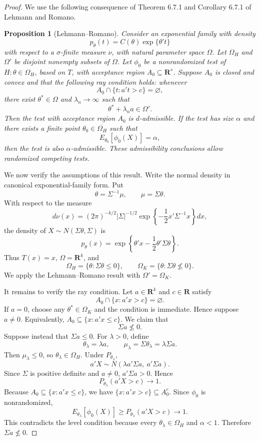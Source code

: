 \documentclass[11pt]{article}
\newtheorem{proposition}{Proposition}
\begin{document}
\begin{proof}
We use the following consequence of Theorem 6.7.1 and Corollary 6.7.1 of Lehmann and Romano.

\begin{proposition}[Lehmann--Romano]
Consider an exponential family with density
\[
p_\theta(t)=C(\theta)\exp\{\theta't\}
\]
with respect to a $\sigma$-finite measure $\nu$, with natural parameter space $\Omega$. Let $\Omega_H$ and $\Omega'$ be disjoint nonempty subsets of $\Omega$. Let $\phi_0$ be a nonrandomized test of $H:\theta\in\Omega_H$, based on $T$, with acceptance region $A_0\subseteq\mathbf R^s$. Suppose $A_0$ is closed and convex and that the following ray condition holds: whenever
\[
A_0\cap\{t:a't>c\}=\varnothing,
\]
there exist $\theta^*\in\Omega$ and $\lambda_n\to\infty$ such that
\[
\theta^*+\lambda_n a\in\Omega'.
\]
Then the test with acceptance region $A_0$ is $d$-admissible. If the test has size $\alpha$ and there exists a finite point $\theta_0\in\overline{\Omega_H}$ such that
\[
E_{\theta_0}[\phi_0(X)]=\alpha,
\]
then the test is also $\alpha$-admissible. These admissibility conclusions allow randomized competing tests.
\end{proposition}

We now verify the assumptions of this result. Write the normal density in canonical exponential-family form. Put
\[
\theta=\Sigma^{-1}\mu,
\qquad
\mu=\Sigma\theta.
\]
With respect to the measure
\[
d\nu(x)=(2\pi)^{-k/2}|\Sigma|^{-1/2}
\exp\left\{-\frac12 x'\Sigma^{-1}x\right\}dx,
\]
the density of $X\sim N(\Sigma\theta,\Sigma)$ is
\[
p_\theta(x)=\exp\left\{\theta'x-\frac12\theta'\Sigma\theta\right\}.
\]
Thus $T(x)=x$, $\Omega=\mathbf R^k$, and
\[
\Omega_H=\{\theta:\Sigma\theta\le 0\},
\qquad
\Omega_K=\{\theta:\Sigma\theta\not\le 0\}.
\]
We apply the Lehmann--Romano result with $\Omega'=\Omega_K$.

It remains to verify the ray condition. Let $a\in\mathbf R^k$ and $c\in\mathbf R$ satisfy
\[
A_0\cap\{x:a'x>c\}=\varnothing.
\]
If $a=0$, choose any $\theta^*\in\Omega_K$ and the condition is immediate.  Hence suppose $a\ne 0$. Equivalently, $A_0\subseteq\{x:a'x\le c\}$. We claim that
\[
\Sigma a\not\le 0.
\]
Suppose instead that $\Sigma a\le 0$. For $\lambda>0$, define
\[
\theta_\lambda=\lambda a,
\qquad
\mu_\lambda=\Sigma\theta_\lambda=\lambda\Sigma a.
\]
Then $\mu_\lambda\le 0$, so $\theta_\lambda\in\Omega_H$. Under $P_{\theta_\lambda}$,
\[
a'X\sim N\left(\lambda a'\Sigma a,\ a'\Sigma a\right).
\]
Since $\Sigma$ is positive definite and $a\ne 0$, $a'\Sigma a>0$. Hence
\[
P_{\theta_\lambda}(a'X>c)\to 1.
\]
Because $A_0\subseteq\{x:a'x\le c\}$, we have $\{x:a'x>c\}\subseteq A_0^c$. Since $\phi_0$ is nonrandomized,
\[
E_{\theta_\lambda}[\phi_0(X)]
\ge P_{\theta_\lambda}(a'X>c)
\to 1.
\]
This contradicts the level condition because every $\theta_\lambda\in\Omega_H$ and $\alpha<1$. Therefore $\Sigma a\not\le 0$.


\end{proof}
\end{document}

